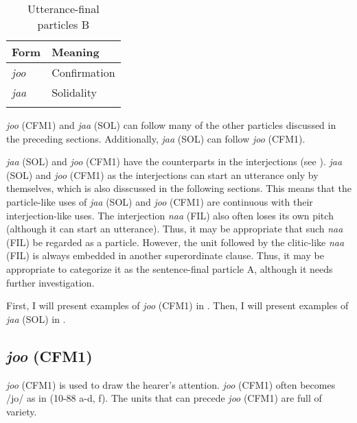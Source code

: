 \begin{table}
\caption{Utterance-final particles B\label{tab:101}}
\begin{tabular}{ll}
\lsptoprule
Form & Meaning\\\midrule
\textit{joo} &  Confirmation\\
\textit{jaa} &  Solidality\\\lspbottomrule
\end{tabular}
\end{table}

\textit{joo} (CFM1) and \textit{jaa} (SOL) can follow many of the other particles discussed in the preceding sections. Additionally, \textit{jaa} (SOL) can follow \textit{joo} (CFM1).

\textit{jaa}  (SOL) and \textit{joo} (CFM1) have the counterparts in the interjections (see ). \textit{jaa} (SOL) and \textit{joo} (CFM1) as the interjections can start an utterance only by themselves, which is also disscussed in the following sections. This means that the particle-like uses of \textit{jaa} (SOL) and \textit{joo} (CFM1) are continuous with their interjection-like uses. The interjection \textit{naa} (FIL) also often loses its own pitch (although it can start an utterance). Thus, it may be appropriate that such \textit{naa} (FIL) be regarded as a particle. However, the unit followed by the clitic-like \textit{naa} (FIL) is always embedded in another superordinate clause. Thus, it may be appropriate to categorize it as the sentence-final particle A, although it needs further investigation.

First, I will present examples of \textit{joo} (CFM1) in . Then, I will present examples of \textit{jaa} (SOL) in .

\subsection{\textit{joo} (CFM1)}\label{sec:10.5.1}

\textit{joo} (CFM1) is used to draw the hearer’s attention. \textit{joo} (CFM1) often becomes /jo/ as in (10-88 a-d, f). The units that can precede \textit{joo} (CFM1) are full of variety.

